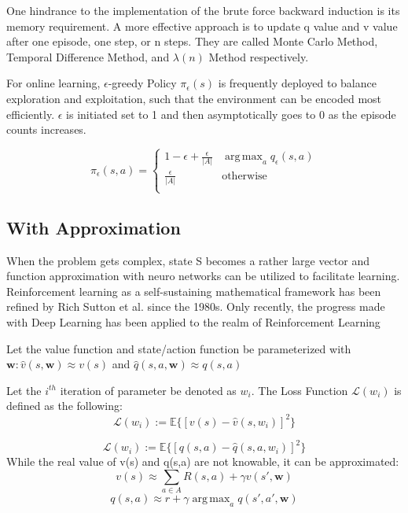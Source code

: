 \documentclass[journal]{IEEEtran}
\DeclareMathOperator*{\argmax}{arg\,max}  %
\begin{document}
One hindrance to the implementation of the brute force backward induction is its memory requirement. A more effective approach is to update q value and v value after one episode, one step, or n steps. They are called Monte Carlo Method, Temporal Difference Method, and $\lambda(n)$ Method respectively.

For online learning, $\epsilon$-greedy Policy $\pi_{\epsilon}(s)$ is frequently deployed to balance exploration and exploitation, such that the environment can be encoded most efficiently. $\epsilon$ is initiated set to 1 and then asymptotically goes to 0 as the episode counts increases.

\begin{equation*}
    \pi_{\epsilon}(s,a) = \begin{cases}
        1-\epsilon+\frac{\epsilon}{|A|}& \displaystyle\argmax_{a} q_{\epsilon}(s,a)\\
        \frac{\epsilon}{|A|}& \text{otherwise}\\
           \end{cases}
\end{equation*}

\subsection{With Approximation}
When the problem gets complex, state S becomes a rather large vector and function approximation with neuro networks can be utilized to facilitate learning. Reinforcement learning as a self-sustaining mathematical framework has been refined by Rich Sutton et al. since the 1980s. Only recently, the progress made with Deep Learning has been applied to the realm of Reinforcement Learning

Let the value function and state/action function be parameterized with $\textbf{w}:  \hat{v}(s,\textbf{w}) \approx v(s)$ and $\hat{q}(s,a,\textbf{w}) \approx q(s,a) $

Let the $i^{th}$ iteration of parameter be denoted as $\textbf{$w_i$}$. The Loss Function $\mathcal{L}(\textbf{$w_i$})$ is defined as the following:
\begin{equation}
    \mathcal{L}(\textbf{$w_i$}) := \mathbb{E}\{[v(s)-\hat{v}(s,\textbf{$w_i$})]^2\}
    \label{v_loss}
\end{equation}

\begin{equation}
    \mathcal{L}(\textbf{$w_i$}) := \mathbb{E}\{[q(s,a)-\hat{q}(s,a,\textbf{$w_i$})]^2\}
    \label{q_loss}
\end{equation}
While the real value of v(s) and q(s,a) are not knowable, it can be approximated:
\begin{equation}
    v(s) \approx \sum_{a \in A} R(s,a)+\gamma v(s',\textbf{w})
    \label{v_approx}
\end{equation}
\begin{equation}
    q(s,a) \approx r+\gamma \argmax_{a} q(s',a',\textbf{w})
    \label{q_approx}
\end{equation}
\end{document}
